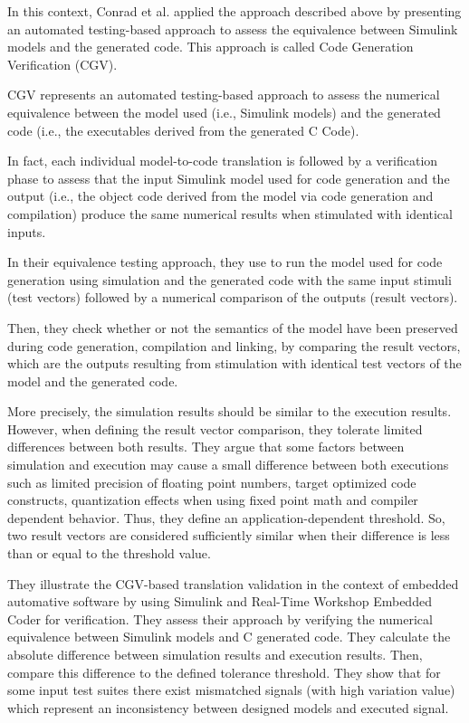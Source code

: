 In this context, Conrad et al.\cite{conrad2010code} applied the approach described above by presenting an automated testing-based approach to assess the equivalence between Simulink models and the generated code. This approach is called Code Generation Verification (CGV).

CGV represents an automated testing-based approach to assess the numerical equivalence between the model used (i.e., Simulink models) and the generated code (i.e., the executables derived from the generated C Code). 

In fact, each individual model-to-code translation is followed by a verification phase to assess that the input Simulink model used for code generation and the output (i.e., the object code derived from the model via code generation and compilation) produce the same numerical results when stimulated with identical inputs. 

In their equivalence testing approach, they use to run the model used for code generation using simulation and the generated code with the same input stimuli (test vectors) followed by a numerical comparison of the outputs (result vectors).

Then, they check whether or not the semantics of the model have been preserved during code generation, compilation and linking, by comparing the result vectors, which are the outputs resulting from stimulation with identical test vectors of the model and the generated code.

More precisely, the simulation results should be similar to the execution results. However, when defining the result vector comparison, they tolerate limited differences between both results. They argue that some factors between simulation and execution may cause a small difference between both executions such as limited precision of floating point numbers, target optimized code constructs, quantization effects when using fixed point math and compiler dependent behavior. 
Thus, they define an application-dependent threshold. So, two result vectors are considered sufficiently similar when their difference is less than or equal to the threshold value.

They illustrate the CGV-based translation validation in the context of embedded automative software by using Simulink and Real-Time Workshop Embedded Coder for verification. They assess their approach by verifying the numerical equivalence between Simulink models and C generated code. They calculate the absolute difference between simulation results and execution results. Then, compare this difference to the defined tolerance threshold. They show that for some input test suites there exist mismatched signals (with high variation value) which represent an inconsistency between designed models and executed signal.

